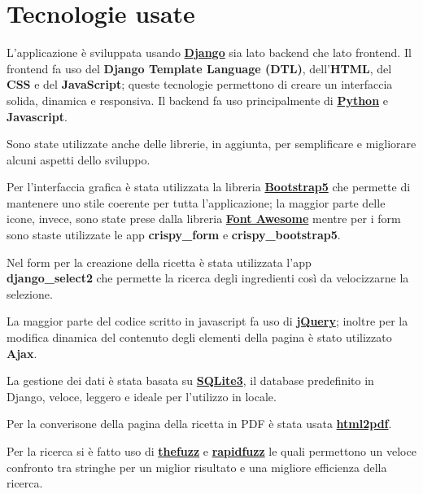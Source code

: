 \documentclass[a4paper]{article}
\begin{document}
    
    \newpage
    \section{Tecnologie usate}
        L'applicazione è sviluppata usando \href{https://www.djangoproject.com/}{\textbf{Django}} 
        sia lato backend che lato frontend.
        Il frontend fa uso del \textbf{Django Template Language (DTL)}, dell'\textbf{HTML}, 
        del \textbf{CSS} e del \textbf{JavaScript}; queste tecnologie permettono di 
        creare un interfaccia solida, dinamica e responsiva.
        Il backend fa uso principalmente di \href{https://www.python.org/}{\textbf{Python}} e \textbf{Javascript}.
        
        Sono state utilizzate anche delle librerie, in aggiunta, per semplificare e 
        migliorare alcuni aspetti dello sviluppo.
        
        Per l'interfaccia grafica è stata utilizzata la libreria \href{https://getbootstrap.com/}{\textbf{Bootstrap5}} 
        che permette di mantenere uno stile coerente per tutta l'applicazione; la maggior parte 
        delle icone, invece, sono state prese dalla libreria \href{https://fontawesome.com/}{\textbf{Font Awesome}} 
        mentre per i form sono staste utilizzate le app \textbf{crispy\_form} e \textbf{crispy\_bootstrap5}.
        
        Nel form per la creazione della ricetta è stata utilizzata l'app \\
        \textbf{django\_select2} che permette la ricerca degli ingredienti così 
        da velocizzarne la selezione.
        
        La maggior parte del codice scritto in javascript fa uso di \href{https://jquery.com/}{\textbf{jQuery}}; 
        inoltre per la modifica dinamica del contenuto degli elementi della pagina è stato utilizzato \textbf{Ajax}.
        
        La gestione dei dati è stata basata su \href{https://www.sqlite.org/}{\textbf{SQLite3}}, il database 
        predefinito in Django, veloce, leggero e ideale per l'utilizzo in locale.
        
        Per la converisone della pagina della ricetta in PDF è stata usata 
        \href{https://ekoopmans.github.io/html2pdf.js/}{\textbf{html2pdf}}.
        
        Per la ricerca si è fatto uso di \href{https://github.com/seatgeek/thefuzz}{\textbf{thefuzz}}
        e \href{https://github.com/rapidfuzz/RapidFuzz}{\textbf{rapidfuzz}} 
        le quali permettono un veloce confronto tra stringhe per un miglior risultato 
        e una migliore efficienza della ricerca.
        
\end{document}
